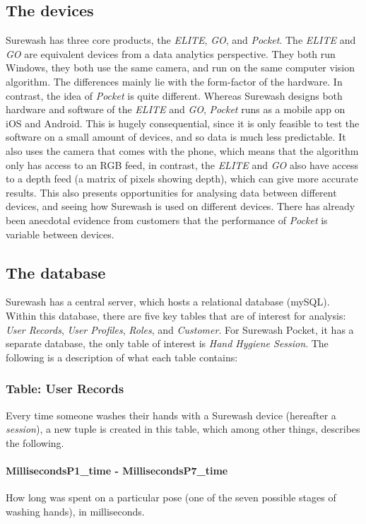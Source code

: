     \subsection{The devices} Surewash has three core products, the {\slshape ELITE}, {\slshape GO}, and {\slshape Pocket}. The {\slshape ELITE} and {\slshape GO} are equivalent devices from a data analytics perspective. They both run Windows, they both use the same camera, and run on the same computer vision algorithm. The differences mainly lie with the form-factor of the hardware. In contrast, the idea of {\slshape Pocket} is quite different. Whereas Surewash designs both hardware and software of the {\slshape ELITE} and {\slshape GO}, {\slshape Pocket} runs as a mobile app on iOS and Android. This is hugely consequential, since it is only feasible to test the software on a small amount of devices, and so data is much less predictable. It also uses the camera that comes with the phone, which means that the algorithm only has access to an RGB feed, in contrast, the {\slshape ELITE} and {\slshape GO} also have access to a depth feed (a matrix of pixels showing depth), which can give more accurate results. This also presents opportunities for analysing data between different devices, and seeing how Surewash is used on different devices. There has already been anecdotal evidence from customers that the performance of {\slshape Pocket} is variable between devices.
    \subsection{The database}
    Surewash has a central server, which hosts a relational database (mySQL). Within this database, there are five key tables that are of interest for analysis: {\slshape User Records}, {\slshape User Profiles}, {\slshape Roles}, and {\slshape Customer}. For Surewash Pocket, it has a separate database, the only table of interest is {\slshape Hand Hygiene Session}. The following is a description of what each table contains:
        \subsubsection{Table: User Records} Every time someone washes their hands with a Surewash device (hereafter a {\slshape session}), a new tuple is created in this table, which among other things, describes the following.
            \paragraph{MillisecondsP1\_time - MillisecondsP7\_time} How long was spent on a particular pose (one of the seven possible stages of washing hands), in milliseconds.
